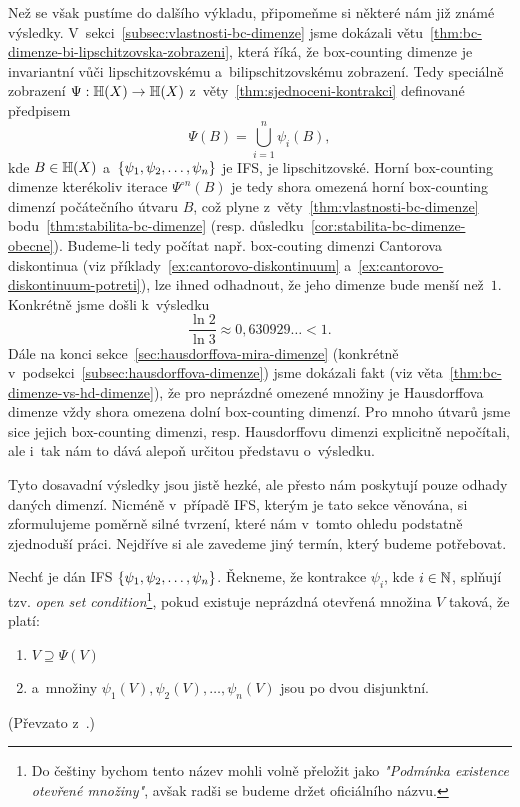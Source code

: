 Než se však pustíme do dalšího výkladu, připomeňme si některé nám již známé výsledky. V~sekci~\ref{subsec:vlastnosti-bc-dimenze} jsme dokázali větu~\ref{thm:bc-dimenze-bi-lipschitzovska-zobrazeni}, která říká, že box-counting dimenze je invariantní vůči lipschitzovskému a~bilipschitzovskému zobrazení. Tedy speciálně zobrazení $\Psi:\mathbb{H}(X) \rightarrow \mathbb{H}(X)$ z~věty~\ref{thm:sjednoceni-kontrakci} definované předpisem
\[\Psi(B)=\bigcup_{i=1}^n\psi_i(B),\]
kde $B\in\mathbb{H}(X)$ a~$\left\{\psi_1,\psi_2,\ldots,\psi_n\right\}$ je IFS, je lipschitzovské. Horní box-counting dimenze kterékoliv iterace $\Psi^{\circ n}(B)$ je tedy shora omezená horní box-counting dimenzí počátečního útvaru $B$, což plyne z~věty~\ref{thm:vlastnosti-bc-dimenze} bodu~\ref{thm:stabilita-bc-dimenze} (resp. důsledku~\ref{cor:stabilita-bc-dimenze-obecne}). Budeme-li tedy počítat např. box-couting dimenzi Cantorova diskontinua (viz příklady~\ref{ex:cantorovo-diskontinuum} a~\ref{ex:cantorovo-diskontinuum-potreti}), lze ihned odhadnout, že jeho dimenze bude menší než~$1$. Konkrétně jsme došli k~výsledku
\[\dfrac{\ln{2}}{\ln{3}}\approx0{,}630929\ldots<1.\]
Dále na konci sekce~\ref{sec:hausdorffova-mira-dimenze} (konkrétně v~podsekci~\ref{subsec:hausdorffova-dimenze}) jsme dokázali fakt (viz věta~\ref{thm:bc-dimenze-vs-hd-dimenze}), že pro neprázdné omezené množiny je Hausdorffova dimenze vždy shora omezena dolní box-counting dimenzí. Pro mnoho útvarů jsme sice jejich box-counting dimenzi, resp. Hausdorffovu dimenzi explicitně nepočítali, ale i~tak nám to dává alepoň určitou představu o~výsledku.

Tyto dosavadní výsledky jsou jistě hezké, ale přesto nám poskytují pouze odhady daných dimenzí. Nicméně v~případě IFS, kterým je tato sekce věnována, si zformulujeme poměrně silné tvrzení, které nám v~tomto ohledu podstatně zjednoduší práci. Nejdříve si ale zavedeme jiný termín, který budeme potřebovat.
\begin{definition}\label{def:open-set-condition}
    Nechť je dán IFS $\left\{\psi_1,\psi_2,\ldots,\psi_n\right\}$. Řekneme, že kontrakce $\psi_i$, kde $i\in\mathbb{N}$, splňují tzv. \emph{open set condition}\footnote{Do češtiny bychom tento název mohli volně přeložit jako \emph{"Podmínka existence otevřené množiny"}, avšak radši se budeme držet oficiálního názvu.}, pokud existuje neprázdná otevřená množina $V$ taková, že platí:
    \begin{enumerate}[label=(\alph*)]
        \item $V\supseteq\Psi(V)$
        \item a~množiny $\psi_1(V),\psi_2(V),\ldots,\psi_n(V)$ jsou po dvou disjunktní.
    \end{enumerate}
\end{definition}
(Převzato z~\citep[str. 139]{Falconer1989}.)

